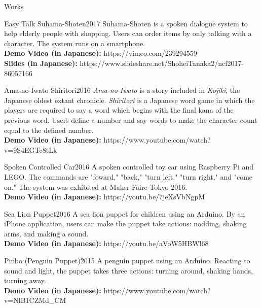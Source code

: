 \documentclass{resume} %
\begin{document}
\begin{rSection}{Works}

\begin{rSubsection}{Easy Talk Suhama-Shoten}{2017}{}{}
Suhama-Shoten is a spoken dialogue system to help elderly people with shopping.
Users can order items by only talking with a character. 
The system runs on a smartphone.
\\{\bf Demo Video (in Japanese):} https://vimeo.com/239294559
\\{\bf Slides (in Japanese):} https://www.slideshare.net/ShoheiTanaka2/ncf2017-86057166
\end{rSubsection}

\begin{rSubsection}{Ama-no-Iwato Shiritori}{2016}{}{}
{\em Ama-no-Iwato} is a story included in {\em Kojiki}, the Japanese oldest extant chronicle.
{\em Shiritori} is a Japanese word game in which the players are required to say a word which begins with the final kana of the previous word.
Users define a number and say words to make the character count equal to the defined number.
\\{\bf Demo Video (in Japanese):} https://www.youtube.com/watch?v=9S4EGTc8tLk
\end{rSubsection}

\begin{rSubsection}{Spoken Controlled Car}{2016}{}{}
A spoken controlled toy car using Raspberry Pi and LEGO.
The commands are "foward," "back," "turn left," "turn right," and "come on."
The system was exhibited at Maker Faire Tokyo 2016.
\\{\bf Demo Video (in Japanese):} https://youtu.be/7jeXsVbNgpM
\end{rSubsection}

\begin{rSubsection}{Sea Lion Puppet}{2016}{}{}
A sea lion puppet for children using an Arduino.
By an iPhone application, users can make the puppet take actions: nodding, shaking arms, and making a sound.
\\{\bf Demo Video (in Japanese):} https://youtu.be/aVoW5HBWl68
\end{rSubsection}

\begin{rSubsection}{Pinbo (Penguin Puppet)}{2015}{}{}
A penguin puppet using an Arduino.
Reacting to sound and light, the puppet takes three actions: turning around, shaking hands, turning away.
\\{\bf Demo Video (in Japanese):} https://www.youtube.com/watch?v=NlB1CZMd_CM
\end{rSubsection}

\end{rSection}
\end{document}
